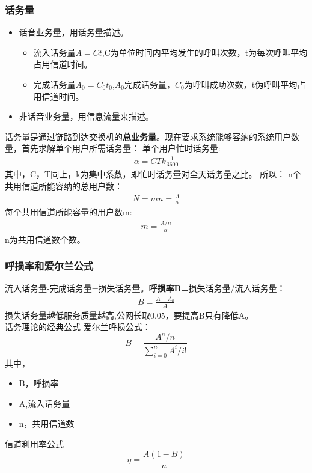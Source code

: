 	\subsubsection{话务量}
	\begin{itemize}
		\item 话音业务量，用话务量描述。
		\begin{itemize}
			\item 流入话务量$A = Ct$,C为单位时间内平均发生的呼叫次数，t为每次呼叫平均占用信道时间。
			\item 完成话务量$A_0=C_0t_0$,$A_0$完成话务量，$C_0$为呼叫成功次数，t伪呼叫平均占用信道时间。
		\end{itemize}
		\item 非话音业务量，用信息流量来描述。
	\end{itemize}
	话务量是通过链路到达交换机的\textbf{总业务量}。现在要求系统能够容纳的系统用户数量，首先求解单个用户所需话务量：
	单个用户忙时话务量:
	\begin{eqnarray}
		\alpha = CTk\frac{1}{3600}
	\end{eqnarray}
	其中，C，T同上，k为集中系数，即忙时话务量对全天话务量之比。
	所以：
	n个共用信道所能容纳的总用户数：
	\begin{eqnarray}
		N = mn = \frac{A}{\alpha}
	\end{eqnarray}
	每个共用信道所能容量的用户数m:
	\begin{eqnarray}
		m = \frac{A/n}{\alpha}
	\end{eqnarray}
	n为共用信道数个数。
	\subsubsection{呼损率和爱尔兰公式}
	流入话务量-完成话务量=损失话务量。\textbf{呼损率B=}损失话务量/流入话务量：
	\begin{eqnarray}
		B = \frac{A-A_0}{A}
	\end{eqnarray}
	损失话务量越低服务质量越高,公网长取0.05，要提高B只有降低A。\\
	话务理论的经典公式-爱尔兰呼损公式：
	\begin{equation}
		B = \frac{A^n/n}{\sum_{i=0}^{n}A^i/i!}
	\end{equation}
	其中，
	\begin{itemize}
		\item B，呼损率
		\item A,流入话务量
		\item n，共用信道数
	\end{itemize}
	 信道利用率公式
	\begin{equation}
	\eta = \frac{A(1-B)}{n}
	\end{equation}


